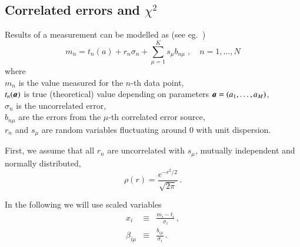 

\newcommand{\rs}{s}
\newcommand{\ce}{b}
\DeclareRobustCommand\Vstat{\ensuremath{V^{\mathrm{(unc)}}}}
\DeclareRobustCommand\Vsys{\ensuremath{V^{\mathrm{(cor)}}}}
\DeclareRobustCommand\mb[1]{\ensuremath{\mbox{\mathversion{bold}{$#1$}}}}
\DeclareRobustCommand\mbs[1]{\ensuremath{\mbox{\mathversion{bold}{\scriptsize $#1$}}}}

\subsection {Correlated errors and \texorpdfstring{$\chi^2$}{chi2}}
\label{sec:cor-chi2}

Results of a measurement can be modelled as
(see eg.~\cite{Stump:2001gu,Botje:2001fx})
\begin{equation}
m_n = t_n(a) + r_n \sigma_n + \sum_{\mu=1}^K \rs_\mu \ce_{n\mu}
\;,\quad n=1,\dots,N
\end{equation}
where\\
$m_n$ is the value measured for the $n$-th data point,\\
$t_n(\mb a)$ is true (theoretical) value depending on parameters $\mb a = (a_1,\dots, a_M)$,\\
$\sigma_n$ is the uncorrelated error,\\
$\ce_{n\mu}$ are the errors from the $\mu$-th correlated error source,\\
$r_n$ and $\rs_\mu$ are random variables fluctuating around 0 with unit dispersion.

First, we assume that all $r_n$ are uncorrelated with $\rs_\mu$,
mutually independent and normally distributed,
\begin{equation}
\rho(r) = \frac{e^{-r^2/2}}{\sqrt{2\pi}}
\,.
\end{equation}

In the following we will use scaled variables
\begin{subequations}
\begin{eqnarray}
x_i &\equiv& \frac{m_i-t_i}{\sigma_i}
\,,
\\
\beta_{i\mu} &\equiv& \frac{\ce_{i\mu}}{\sigma_i}
\,.
\end{eqnarray}
\end{subequations}

